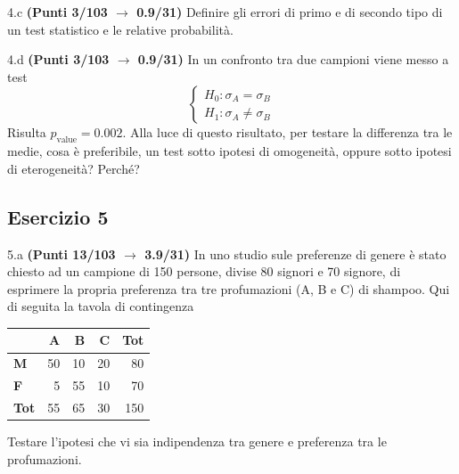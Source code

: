 \documentclass[
  11pt,
]{book}
\theoremstyle{mytheoremstyle}
\theoremstyle{mydefstyle}
\begin{document}
4.c \textbf{(Punti 3/103 \(\rightarrow\) 0.9/31)} Definire gli errori di primo e di secondo
tipo di un test statistico e le relative probabilità.

4.d \textbf{(Punti 3/103 \(\rightarrow\) 0.9/31)} In un confronto tra due campioni viene messo a test
\[
\begin{cases}
H_0:\sigma_A=\sigma_B\\
H_1:\sigma_A\ne \sigma_B
\end{cases}
\]
Risulta \(p_\text{value}=0.002\). Alla luce di questo risultato, per testare la differenza tra le medie, cosa è preferibile, un test sotto ipotesi di omogeneità, oppure sotto ipotesi di eterogeneità? Perché?

\subsection{Esercizio 5}\label{esercizio-5-14}

5.a \textbf{(Punti 13/103 \(\rightarrow\) 3.9/31)} In uno studio sule preferenze di genere è stato chiesto ad un campione di 150 persone,
divise 80 signori e 70 signore, di esprimere la propria preferenza tra tre profumazioni (A, B e C)
di shampoo.
Qui di seguita la tavola di contingenza

\begin{table}[H]
\centering
\begin{tabular}{>{}lrrrr}
\toprule
  & A & B & C & Tot\\
\midrule
\textbf{M} & 50 & 10 & 20 & 80\\
\textbf{F} & 5 & 55 & 10 & 70\\
\textbf{Tot} & 55 & 65 & 30 & 150\\
\bottomrule
\end{tabular}
\end{table}

Testare l'ipotesi che vi sia indipendenza tra genere e preferenza tra le profumazioni.
\end{document}
